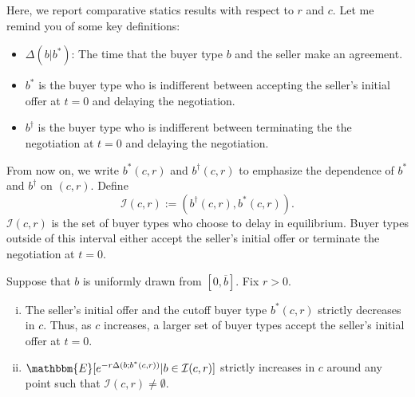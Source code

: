 Here, we report comparative statics results with respect to $r$ and $c$. 
Let me remind you of some key definitions: 
    \begin{itemize}
    \item $\Delta(b|b^*)$: The time that the buyer type $b$ and the seller make an agreement. 
    
    \item $b^*$ is the buyer type who is indifferent between accepting the seller's initial offer at $t=0$ and delaying the negotiation. 

    \item $b^\dagger$ is the buyer type who is indifferent between terminating the the negotiation at $t=0$ and delaying the negotiation. 
    \end{itemize}

From now on, we write $b^*(c,r)$ and $b^\dagger(c,r)$ to emphasize the dependence of $b^*$ and $b^\dagger$ on $(c,r)$. Define
    $$
    \mathcal{I}(c,r) := (b^\dagger(c,r), b^*(c,r)).
    $$
$\mathcal{I}(c,r)$ is the set of buyer types who choose to delay in equilibrium. Buyer types outside of this interval either accept the seller's initial offer or terminate the negotiation at $t=0$. 
    


\begin{proposition}\label{p:uniform_symmetric_cs_c}
Suppose that $b$ is uniformly drawn from $[0,\overline b]$. Fix $r>0$.
    \begin{enumerate}[(i)]
    \item The seller's initial offer and the cutoff buyer type $b^*(c,r)$ strictly decreases in $c$. Thus, as $c$ increases, a larger set of buyer types accept the seller's initial offer at $t=0$. 

    \item $\mathbbm{E}[e^{-r\Delta(b;b^*(c,r))}|b\in \mathcal{I}(c,r)]$
    strictly increases in $c$ around any point such that $\mathcal{I}(c,r)\neq \emptyset$.

    \end{enumerate}
\end{proposition}



